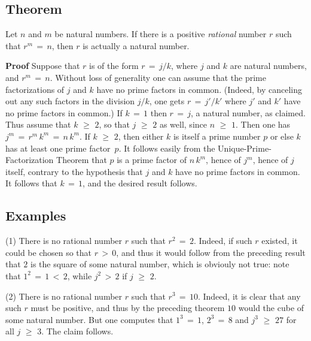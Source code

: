 \V

            \subsection{\small{\bf Theorem}}
            \label{ThmA20.05A}

\V

        Let $n$ and $m$ be natural numbers. If there is a positive {\em rational} number $r$ such that $r^{m} \,=\, n$,
    then $r$ is actually a natural number.

\V

        {\bf Proof} Suppose that $r$ is of the form $r \,=\, j/k$, where $j$ and $k$ are natural numbers, and $r^{m} \,=\, n$.
    Without loss of generality one can assume that the prime factorizations of $j$ and $k$ have no prime factors in common.
    (Indeed, by canceling out any such factors in the division $j/k$, one gets $r \,=\, j'/k'$ where $j'$ and $k'$ have no prime factors in common.)
    If $k \,=\, 1$ then $r \,=\, j$, a natural number, as claimed. Thus assume that $k\,\,{\geq}\,\,2$, so that $j\,\,{\geq}\,\,2$ as well, since $n\,\,{\geq}\,\,1$.
    Then one has $j^{m} \,=\, r^{m}\,k^{m} \,=\, n\,k^{m}$. If $k\,\,{\geq}\,\,2$,
    then either $k$ is itself a prime number $p$ or else $k$ has at least one prime factor~$p$.
    It follows easily from the Unique-Prime-Factorization Theorem that $p$ is a prime factor of $n\,k^{m}$, hence of $j^{m}$, hence of $j$ itself,
    contrary to the hypothesis that $j$ and $k$ have no prime factors in common. It follows that $k \,=\, 1$, and the desired result follows.

            \subsection{\bf Examples}
            \label{ExampA20.05B}

\V

\hspace*{\parindent} (1) There is no rational number $r$ such that $r^{2} \,=\, 2$. Indeed, if such $r$ existed, it could be chosen so that $r\,>\,0$,
    and thus it would follow from the preceding result that $2$ is the square of some natural number, which is obviouly not true: note that $1^{2} \,=\, 1\,<\,2$, while $j^{2}\,>\,2$ if $j\,\,{\geq}\,\,2$.

\V

        (2) There is no rational number $r$ such that $r^{3} \,=\, 10$. Indeed, it is clear that any such $r$ must be positive,
    and thus by the preceding theorem $10$ would the cube of some natural number. But one computes that
    $1^{3} \,=\, 1$, $2^{3} \,=\, 8$ and $j^{3}\,\,{\geq}\,\,27$ for all $j\,\,{\geq}\,\,3$. The claim follows.

